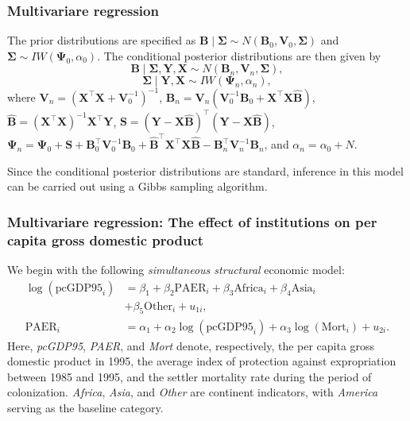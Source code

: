 \documentclass[12pt, compress]{beamer}
\begin{document}
\begin{frame}
	\frametitle{Multivariare regression}
The prior distributions are specified as $\bm{B} \mid \bm{\Sigma} \sim N(\bm{B}_0, \bm{V}_0, \bm{\Sigma})$ and $\bm{\Sigma} \sim IW(\bm{\Psi}_0, \alpha_0)$. The conditional posterior distributions are then given by
\begin{equation*}
	\bm{B} \mid \bm{\Sigma}, \bm{Y}, \bm{X} \sim N(\bm{B}_n, \bm{V}_n, \bm{\Sigma}),
\end{equation*}
\begin{equation*}
	\bm{\Sigma} \mid \bm{Y}, \bm{X} \sim IW(\bm{\Psi}_n, \alpha_n),
\end{equation*}
where $\bm{V}_n = (\bm{X}^{\top}\bm{X} + \bm{V}_0^{-1})^{-1}$, $\bm{B}_n = \bm{V}_n(\bm{V}_0^{-1}\bm{B}_0 + \bm{X}^{\top}\bm{X}\hat{\bm{B}})$, $\hat{\bm{B}} = (\bm{X}^{\top}\bm{X})^{-1}\bm{X}^{\top}\bm{Y}$, ${\bm{S}} = (\bm{Y} - \bm{X}\hat{\bm{B}})^{\top}(\bm{Y} - \bm{X}\hat{\bm{B}})$, $\bm{\Psi}_n = \bm{\Psi}_0 + \bm{S} + \bm{B}_0^{\top}\bm{V}_0^{-1}\bm{B}_0 + \hat{\bm{B}}^{\top}\bm{X}^{\top}\bm{X}\hat{\bm{B}} - \bm{B}_n^{\top}\bm{V}_n^{-1}\bm{B}_n$, and $\alpha_n = \alpha_0 + N$.

Since the conditional posterior distributions are standard, inference in this model can be carried out using a Gibbs sampling algorithm.
\end{frame}

\begin{frame}
	\frametitle{Multivariare regression: The effect of institutions on per capita gross domestic product}
We begin with the following \textit{simultaneous structural} economic model:
\begin{align}\label{eq:str1}
	\log(\text{pcGDP95}_i) &= \beta_1 + \beta_2 \text{PAER}_i + \beta_3 \text{Africa}_i + \beta_4 \text{Asia}_i\nonumber \\
    &+ \beta_5 \text{Other}_i + u_{1i},\\
	\text{PAER}_i &= \alpha_1 + \alpha_2 \log(\text{pcGDP95}_i) + \alpha_3 \log(\text{Mort}_i) + u_{2i}. \label{eq:str2}
\end{align}
Here, \textit{pcGDP95}, \textit{PAER}, and \textit{Mort} denote, respectively, the per capita gross domestic product in 1995, the average index of protection against expropriation between 1985 and 1995, and the settler mortality rate during the period of colonization. \textit{Africa}, \textit{Asia}, and \textit{Other} are continent indicators, with \textit{America} serving as the baseline category.
\end{frame}
\end{document}
